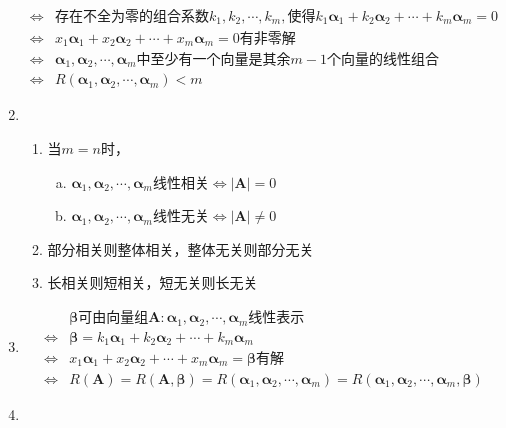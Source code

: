 \documentclass[12pt]{book}
\begin{document}
\begin{enumerate}[1.]
\begin{align*}
              \Leftrightarrow & \text{存在不全为零的组合系数}k_1,k_2,\cdots,k_m,\text{使得} k_1\bm{\alpha}_1+k_2\bm{\alpha}_2+\cdots+k_m\bm{\alpha}_m=0 \\
              \Leftrightarrow & x_1\bm{\alpha}_1+x_2\bm{\alpha}_2+\cdots+x_m\bm{\alpha}_m=0\text{有非零解}                                              \\
              \Leftrightarrow & \bm{\alpha}_1,\bm{\alpha}_2,\cdots,\bm{\alpha}_{m}\text{中至少有一个向量是其余}m-1\text{个向量的线性组合}                      \\
              \Leftrightarrow & R(\bm{\alpha}_1,\bm{\alpha}_2,\cdots,\bm{\alpha}_{m})<m
          \end{align*}
    \item
          \begin{enumerate}[(1)]
              \item 当$m=n$时，
                    \begin{enumerate}[a.]
                        \item $\bm{\alpha}_1,\bm{\alpha}_2,\cdots,\bm{\alpha}_{m}$线性相关$\Leftrightarrow |\bm{A}|=0$
                        \item $\bm{\alpha}_1,\bm{\alpha}_2,\cdots,\bm{\alpha}_{m}$线性无关$\Leftrightarrow |\bm{A}|\neq 0$
                    \end{enumerate}
              \item 部分相关则整体相关，整体无关则部分无关
              \item 长相关则短相关，短无关则长无关
          \end{enumerate}
    \item
          \begin{align*}
                              & \bm{\beta}\text{可由}\text{向量组}\bm{A}:\bm{\alpha}_1,\bm{\alpha}_2,\cdots,\bm{\alpha}_m\text{线性表示} \\
              \Leftrightarrow & \bm{\beta} = k_1\bm{\alpha}_1+k_2\bm{\alpha}_2+\cdots+k_m\bm{\alpha}_m                                        \\
              \Leftrightarrow & x_1\bm{\alpha}_1+x_2\bm{\alpha}_2+\cdots+x_m\bm{\alpha}_m=\bm{\beta}\text{有解}                               \\
              \Leftrightarrow & R(\bm{A}) = R(\bm{A}, \bm{\beta})=R(\bm{\alpha}_1,\bm{\alpha}_2,\cdots,\bm{\alpha}_{m})=R(\bm{\alpha}_1,\bm{\alpha}_2,\cdots,\bm{\alpha}_{m},\bm{\beta}) 
          \end{align*}
    \item

\end{enumerate}
\end{document}
